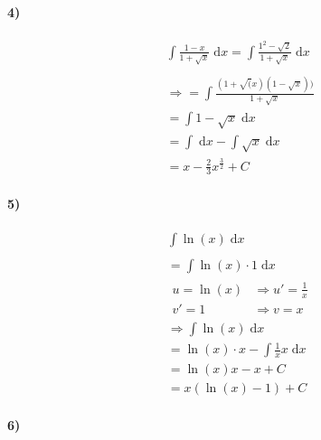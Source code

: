 \paragraph{4)}

\begin{align*}
	 & \int \frac{1-x}{1+\sqrt{x}} \;\mathrm{d}x = \int \frac{1^2 - \sqrt{2}}{1+ \sqrt{x}} \;\mathrm{d}x \\
	\\
	 & \Rightarrow = \int \frac{(1 + \sqrt(x) (1 - \sqrt{x}))}{1 + \sqrt{x}}                             \\
	 & = \int 1 - \sqrt{x} \;\mathrm{d}x                                                                 \\
	 & = \int \;\mathrm{d}x - \int \sqrt{x} \;\mathrm{d}x                                                \\
	 & = x - \frac{2}{3} x^{\frac{3}{2}} + C
\end{align*}

\paragraph{5)}

\begin{align*}
	 & \int \ln(x) \;\mathrm{d}x                         \\
	\\
	 & = \int \ln(x) \cdot 1 \;\mathrm{d}x               \\
	 & \begin{array}{ll}
		u = \ln(x) & \Rightarrow u' = \frac{1}{x} \\
		v' = 1     & \Rightarrow v = x
	\end{array}                         \\
	 & \Rightarrow\int\ln(x) \;\mathrm{d}x               \\
	 & = \ln(x) \cdot x- \int\frac{1}{x} x \;\mathrm{d}x \\
	 & = \ln(x) x-x+C                                    \\
	 & = x (\ln(x)-1) +C
\end{align*}

\paragraph{6)}

